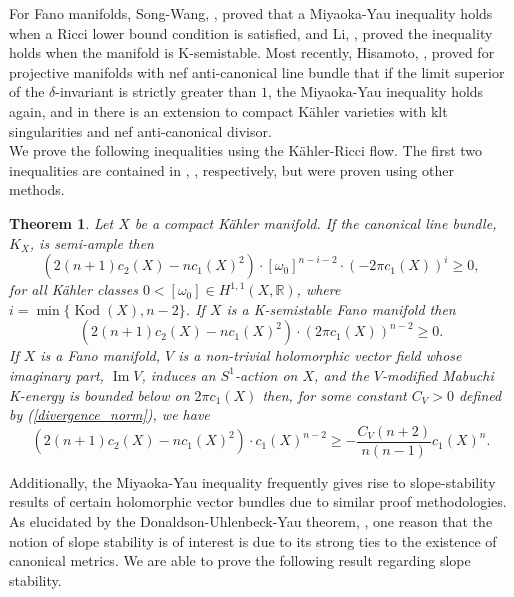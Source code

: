 \documentclass[12pt]{article}
\newtheorem{theorem}{Theorem}[section]
\numberwithin{equation}{section}
\newcommand{\R}{\mathbb{R}}
\DeclareMathOperator{\Kod}{Kod}
\DeclareMathOperator{\Imag}{Im}
\begin{document}
\noindent For Fano manifolds, Song-Wang, \cite{SW16}, proved that a Miyaoka-Yau inequality holds when a Ricci lower bound condition is satisfied, and Li, \cite{L21}, proved the inequality holds when the manifold is K-semistable. Most recently, Hisamoto, \cite{H24}, proved for projective manifolds with nef anti-canonical line bundle that if the limit superior of the $\delta$-invariant is strictly greater than $1$, the Miyaoka-Yau inequality holds again, and in \cite{IJZ25} there is an extension to compact K\"ahler varieties with klt singularities and nef anti-canonical divisor.\\

\noindent We prove the following inequalities using the K\"ahler-Ricci flow. The first two inequalities are contained in \cite{L23}, \cite{L21}, respectively, but were proven using other methods.

\begin{theorem}
Let $X$ be a compact K\"ahler manifold. If the canonical line bundle, $K_X$, is semi-ample then
\begin{equation*}
    (2(n+1) c_2(X) - n c_1(X)^2) \cdot [\omega_0]^{n-i-2} \cdot (-2 \pi c_1(X))^i \geq 0,
\end{equation*}
for all K\"ahler classes $0 < [\omega_0] \in H^{1,1}(X,\R)$, where $i = \min\{\Kod(X), n-2\}$. If $X$ is a K-semistable Fano manifold then
\begin{equation*}
   (2(n+1) c_2(X) - n c_1(X)^2) \cdot (2 \pi c_1(X))^{n-2} \geq 0.
\end{equation*}
If $X$ is a Fano manifold, $V$ is a non-trivial holomorphic vector field whose imaginary part, $\Imag V$, induces an $S^1$-action on $X$, and the $V$-modified Mabuchi K-energy is bounded below on $2 \pi c_1(X)$ then, for some constant $C_V > 0$ defined by (\ref{divergence_norm}), we have
\begin{equation*}
    (2(n+1) c_2(X) - n c_1(X)^2) \cdot c_1(X)^{n-2} \geq -\frac{C_V(n+2)}{n(n-1)} c_1(X)^n.
\end{equation*}
\end{theorem}

\noindent Additionally, the Miyaoka-Yau inequality frequently gives rise to slope-stability results of certain holomorphic vector bundles due to similar proof methodologies. As elucidated by the Donaldson-Uhlenbeck-Yau theorem, \cite{UY86}, one reason that the notion of slope stability is of interest is due to its strong ties to the existence of canonical metrics. We are able to prove the following result regarding slope stability. 
\end{document}
